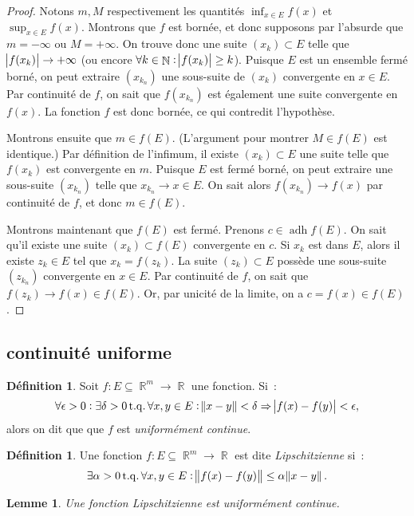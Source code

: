 \documentclass{article}
\DeclareMathOperator{\R}{\mathbb R}
\DeclareMathOperator{\N}{\mathbb N}
\DeclareMathOperator{\adh}{adh}
\DeclareMathOperator{\tq}{ t.q. }
\newcommand{\frmr}[2]{#1 : #2 \subseteq \R^m \to \R}
\newtheorem{lem}[thm]{Lemme}
\theoremstyle{definition}
\newtheorem{déf}[thm]{Définition}
\theoremstyle{remark}
\begin{document}
		\begin{proof} Notons $m, M$ respectivement les quantités $\inf_{x \in E}f(x)$ et $\sup_{x \in E}f(x)$. Montrons que $f$ est bornée, et donc supposons par
		l'absurde que $m = -\infty$ ou $M = +\infty$.  On trouve donc une suite $(x_k) \subset E$ telle que $\abs {f(x_k)} \to +\infty$ (ou encore
		$\forall k \in \N : \abs{f(x_k)} \geq k$). Puisque $E$ est un ensemble fermé borné, on peut extraire $(x_{k_n})$ une sous-suite de $(x_k)$ convergente
		en $x \in E$. Par continuité de $f$, on sait que $f(x_{k_n})$ est également une suite convergente en $f(x)$. La fonction $f$ est donc bornée, ce qui
		contredit l'hypothèse.

		Montrons ensuite que $m \in f(E)$. (L'argument pour montrer $M \in f(E)$ est identique.) Par définition de l'infimum, il existe $(x_k) \subset E$ une
		suite telle que $f(x_k)$ est convergente en $m$. Puisque $E$ est fermé borné, on peut extraire une sous-suite $(x_{k_n})$ telle que $x_{k_n} \to x \in E$.
		On sait alors $f(x_{k_n}) \to f(x)$ par continuité de $f$, et donc $m \in f(E)$.

		Montrons maintenant que $f(E)$ est fermé. Prenons $c \in \adh f(E)$. On sait qu'il existe une suite $(x_k) \subset f(E)$ convergente en $c$. Si $x_k$
		est dans $E$, alors il existe $z_k \in E$ tel que $x_k = f(z_k)$. La suite $(z_k) \subset E$ possède une sous-suite $(z_{k_n})$ convergente en $x \in E$.
		Par continuité de $f$, on sait que $f(z_k) \to f(x) \in f(E)$. Or, par unicité de la limite, on a $c = f(x) \in f(E)$.
		\end{proof}

	\subsection{continuité uniforme}
		\begin{déf} Soit $\frmr fE$ une fonction. Si~:
		\[\forall \epsilon > 0 : \exists \delta > 0 \tq \forall x, y \in E : \norm{x-y} < \delta \Rightarrow \abs{f(x)-f(y)} < \epsilon,\]
		alors on dit que que $f$ est \emph{uniformément continue}.
		\end{déf}

		\begin{déf} Une fonction $\frmr fE$ est dite \emph{Lipschitzienne} si~:
		\[\exists \alpha > 0 \tq \forall x, y \in E : \norm{f(x)-f(y)} \leq \alpha\norm{x-y}.\]
		\end{déf}

		\begin{lem} Une fonction Lipschitzienne est uniformément continue. \end{lem}
\end{document}
